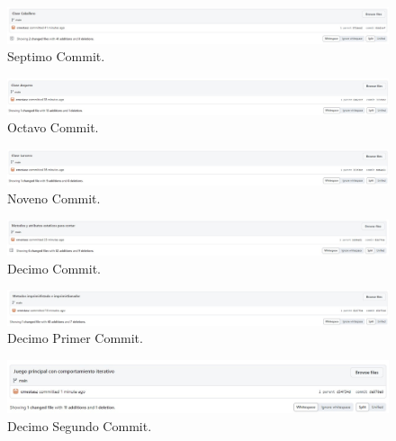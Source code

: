 \documentclass{article}
\begin{document}
\begin{figure}[H]
	\centering
	\includegraphics[width=1\textwidth,keepaspectratio]{img/commit07.jpg}
	\caption{Septimo Commit.}
\end{figure}
\begin{figure}[H]
	\centering
	\includegraphics[width=1\textwidth,keepaspectratio]{img/commit08.jpg}
	\caption{Octavo Commit.}
\end{figure}
\begin{figure}[H]
	\centering
	\includegraphics[width=1\textwidth,keepaspectratio]{img/commit09.jpg}
	\caption{Noveno Commit.}
\end{figure}
\begin{figure}[H]
	\centering
	\includegraphics[width=1\textwidth,keepaspectratio]{img/commit10.jpg}
	\caption{Decimo Commit.}
\end{figure}
\begin{figure}[H]
	\centering
	\includegraphics[width=1\textwidth,keepaspectratio]{img/commit11.jpg}
	\caption{Decimo Primer Commit.}
\end{figure}
\begin{figure}[H]
	\centering
	\includegraphics[width=1\textwidth,keepaspectratio]{img/commit12.jpg}
	\caption{Decimo Segundo Commit.}
\end{figure}
\pagebreak
\end{document}
